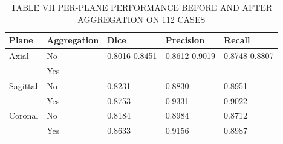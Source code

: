 \begin{table}[htbp]
\centering
\caption{TABLE VII PER-PLANE PERFORMANCE BEFORE AND AFTER AGGREGATION ON 112 CASES}
\label{tab:table\_007}
\begin{tabular}{lllll}
\hline
Plane & Aggregation & Dice & Precision & Recall \\
\hline
Axial & No & 0.8016 0.8451 & 0.8612 0.9019 & 0.8748 0.8807 \\
 & Yes &  &  &  \\
Sagittal & No & 0.8231 & 0.8830 & 0.8951 \\
 & Yes & 0.8753 & 0.9331 & 0.9022 \\
Coronal & No & 0.8184 & 0.8984 & 0.8712 \\
 & Yes & 0.8633 & 0.9156 & 0.8987 \\
\hline
\end{tabular}
\end{table}
